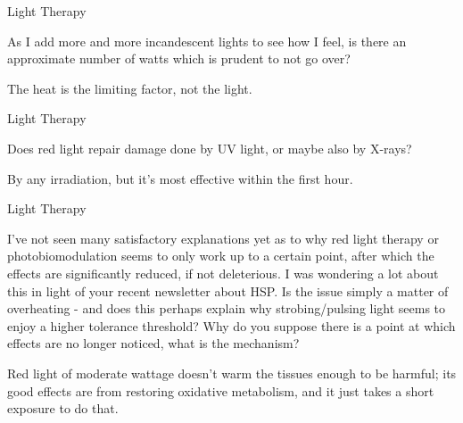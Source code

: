 \documentclass[11pt,oneside,openany,extrafontsizes]{memoir}
\begin{document}
\begin{qaexchange}{Light Therapy}

    \begin{question}
        As I add more and more incandescent lights to see how I feel, is there an approximate number of watts which is prudent to not go over?
    \end{question}

    \begin{answer}
        The heat is the limiting factor, not the light.
    \end{answer}
\end{qaexchange}

\begin{qaexchange}{Light Therapy}

    \begin{question}
        Does red light repair damage done by UV light, or maybe also by X-rays?
    \end{question}

    \begin{answer}
        By any irradiation, but it's most effective within the first hour.
    \end{answer}
\end{qaexchange}

\begin{qaexchange}{Light Therapy}

    \begin{question}
        I've not seen many satisfactory explanations yet as to why red light therapy or photobiomodulation seems to only work up to a certain point, after which the effects are significantly reduced, if not deleterious. I was wondering a lot about this in light of your recent newsletter about HSP. Is the issue simply a matter of overheating - and does this perhaps explain why strobing/pulsing light seems to enjoy a higher tolerance threshold? Why do you suppose there is a point at which effects are no longer noticed, what is the mechanism?
    \end{question}

    \begin{answer}
        Red light of moderate wattage doesn't warm the tissues enough to be harmful; its good effects are from restoring oxidative metabolism, and it just takes a short exposure to do that.
    \end{answer}
\end{qaexchange}
\end{document}
